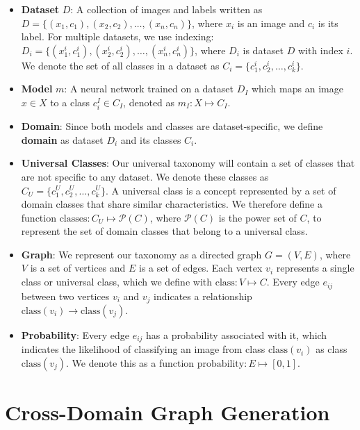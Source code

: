 \begin{itemize}
      \item \textbf{Dataset} $D$: A collection of images and labels
            written as $D = \{(x_1, c_1), (x_2, c_2), \ldots, (x_n, c_n)\}$,
            where $x_i$ is an image and $c_i$ is its label.
            For multiple datasets, we use indexing:
            $D_i = \{(x_1^i, c_1^i), (x_2^i, c_2^i), \ldots, (x_n^i, c_n^i)\}$,
            where $D_i$ is dataset $D$ with index $i$.
            We denote the set of all classes in a dataset as $C_i = \{c_1^i, c_2^i, \ldots, c_k^i\}$.
      \item \textbf{Model} $m$: A neural network trained on a dataset $D_I$
            which maps an image $x\in X$ to a class $c_i^I\in C_I$, denoted as $m_I: X \mapsto C_I$.
      \item \textbf{Domain}: Since both models and classes are dataset-specific,
            we define \textbf{domain} as dataset $D_i$ and its classes $C_i$.
      \item \textbf{Universal Classes}: Our universal taxonomy will contain a set of classes
            that are not specific to any dataset.
            We denote these classes as $C_U = \{c_1^U, c_2^U, \ldots, c_k^U\}$.
            A universal class is a concept represented by a set of domain classes
            that share similar characteristics. We therefore define a function
            $\text{classes}: C_U \mapsto \mathcal{P}(C)$, where $\mathcal{P}(C)$ is the power set of $C$,
            to represent the set of domain classes that belong to a universal class.
      \item \textbf{Graph}: We represent our taxonomy as a directed graph $G = (V, E)$,
            where $V$ is a set of vertices and $E$ is a set of edges.
            Each vertex $v_i$ represents a single class or universal class,
            which we define with $\text{class}: V \mapsto C$.
            Every edge $e_{ij}$ between two vertices $v_i$ and $v_j$ indicates
            a relationship $\text{class}(v_i) \rightarrow \text{class}(v_j)$.
      \item \textbf{Probability}: Every edge $e_{ij}$ has a probability associated with it,
            which indicates the likelihood of classifying an image from class $\text{class}(v_i)$
            as class $\text{class}(v_j)$.
            We denote this as a function $\text{probability}: E \mapsto [0, 1]$.
\end{itemize}

\section{Cross-Domain Graph Generation} \label{sec:graph_construction}

